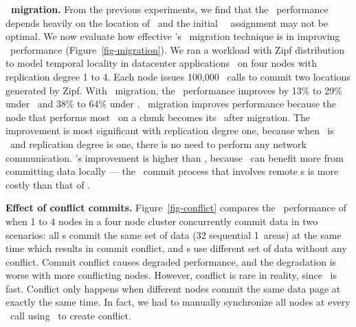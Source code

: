 {\bf \on\ migration.}
From the previous experiments, we find that the \commitxact\ performance depends heavily on the location of \on\
and the initial \hotpot\ \on\ assignment may not be optimal.
We now evaluate how effective \hotpot's \on\ migration technique is in improving \commitxact\ performance (Figure~\ref{fig-migration}). 
We ran a workload with Zipf distribution to model temporal locality in datacenter applications~\cite{Atikoglu12,Breslau99} on four nodes with replication degree 1 to 4.
Each node issues 100,000 \commitxact\ calls to commit two locations generated by Zipf.
With \on\ migration, the \commitxact\ performance improves by 13\% to 29\% under \mrsw\ and 38\% to 64\% under \mrmw.
\on\ migration improves performance because the node that performs most \commitxact\ on a chunk becomes its \on\ after migration.
The improvement is most significant with replication degree one, 
because when \xn\ is \on\ and replication degree is one, there is no need to perform any network communication.
\mrmw's improvement is higher than \mrsw, because \mrmw\ can benefit more from committing data locally
--- the \mrmw\ commit process that involves remote \on{}s is more costly than that of \mrsw.

{\bf Effect of conflict commits.}
Figure~\ref{fig-conflict} compares the \commitxact\ performance of when 1 to 4 nodes in a four node cluster 
concurrently commit data in two scenarios:
all \xn{}s commit the same set of data (32 sequential 1\KB\ areas) at the same time which results in commit conflict,
and \xn{}s use different set of data without any conflict.
Commit conflict causes degraded performance, 
and the degradation is worse with more conflicting nodes.
However, conflict is rare in reality, since \commitxact\ is fast.
Conflict only happens when different nodes commit the same data page at exactly the same time.
In fact, we had to manually synchronize all nodes at every \commitxact\ call using \barrier\ to create conflict.
